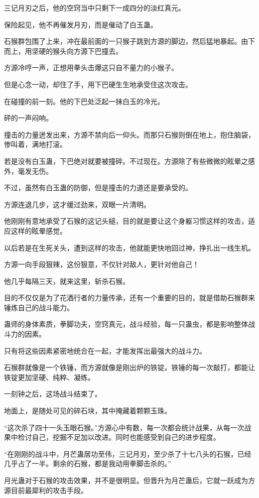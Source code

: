 \begin{this_body}
三记月刃之后，他的空窍当中只剩下一成四分的淡红真元。

保险起见，他不再催发月刃，而是催动了白玉蛊。

石猴群包围了上来，冲在最前面的一只猴子跳到方源的脚边，然后猛地暴起。由下而上，用坚硬的猴头向方源下巴撞去。

方源冷哼一声，正想用拳头击爆这只自不量力的小猴子。

但是心念一动，却住了手，用下巴硬生生地承受住这次攻击。

在碰撞的前一刻。他的下巴处泛起一抹白玉的冷光。

砰的一声闷响。

撞击的力量迸发出来，方源不禁向后一仰头。而那只石猴则倒在地上，抱住脑袋，惨叫着，满地打滚。

若是没有白玉蛊，下巴绝对就要被撞碎。不过现在。方源除了有些微微的眩晕之感外，毫发无伤。

不过，虽然有白玉蛊的防御，但是撞击的力道还是要承受的。

方源连退几步，这才缓过劲来，双眼一片清明。

他刚刚有意地承受了石猴的这记头槌，目的就是要让这个身躯习惯这样的攻击，适应这样的眩晕感觉。

以后若是在生死关头，遭到这样的攻击，他就能更快地回过神，挣扎出一线生机。

方源一向手段狠辣，这份狠意，不仅针对敌人，更针对他自己！

他几乎每隔三天，就来这里，斩杀石猴。

目的不仅仅是为了花酒行者的力量传承，还有一个重要的目的，就是借助石猴群来锤炼自己的战斗能力。

蛊师的身体素质，拳脚功夫，空窍真元，战斗经验，每一只蛊虫，都是影响整体战斗力的因素。

只有将这些因素紧密地统合在一起，才能发挥出最强大的战斗力。

石猴群就像是一个铁锤，而方源就像是刚出炉的铁锭。铁锤的每一次敲打，都能让铁锭更加坚硬、纯粹、凝练。

一刻钟之后，这场战斗结束了。

地面上，是随处可见的碎石块，其中掩藏着颗颗玉珠。

“这次杀了四十一头玉眼石猴。”方源心中有数，每一次都会统计战果，从每一次战果中检讨自己，挖掘不足加以改进。同时也能感受到自己的进步程度。

“在刚刚的战斗中，月芒蛊居功至伟，三记月刃，至少杀了十七八头的石猴，已经几乎占了一半。剩余的石猴，都是我动用拳脚击杀的。”

月光蛊对于石猴的攻击效果，并不是很明显。但晋升为月芒蛊后，它就一跃成为方源目前最犀利的攻击手段。


\end{this_body}
